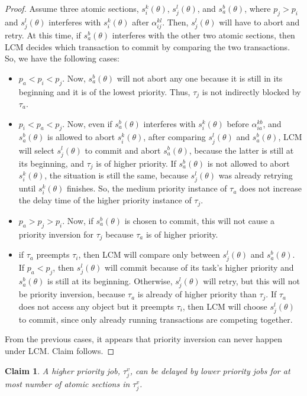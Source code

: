 \documentclass[a4paper,english]{article}
\newtheorem{clm}{Claim}
\newtheorem{proof}{Proof}
\begin{document}
\begin{proof}\normalfont
Assume three atomic sections, $s_i^k(\theta)$, $s_j^l(\theta)$, and $s_a^b(\theta)$, where $p_j > p_i$ and $s_j^l(\theta)$ interferes with $s_i^k(\theta)$ after $\alpha_{ij}^{kl}$. Then, $s_j^l(\theta)$ will have to abort and retry. At this time, if $s_a^b(\theta)$ interferes with the other two atomic sections, then LCM decides which transaction to commit by comparing the two transactions. So, we have the following cases:
\begin{itemize}
\item $p_a < p_i < p_j$. Now, $s_a^b(\theta)$ will not abort any one because it is still in its beginning and it is of the lowest priority. Thus, $\tau_j$ is not indirectly blocked by $\tau_a$.
\item $p_i<p_a<p_j$. Now, even if $s_a^b(\theta)$ interferes with $s_i^k(\theta)$ before $\alpha_{ia}^{kb}$,  and $s_a^b(\theta)$ is allowed to abort $s_i^k(\theta)$, after comparing $s_j^l(\theta)$ and $s_a^b(\theta)$, LCM will select $s_j^l(\theta)$ to commit and abort $s_a^b(\theta)$, because the latter is still at its beginning, and $\tau_j$ is of higher priority. If $s_a^b(\theta)$ is not allowed to abort $s_i^k(\theta)$, the situation is still the same, because $s_j^l(\theta)$ was already retrying until $s_i^k(\theta)$ finishes. So, the medium priority instance of $\tau_a$ does not increase the delay time of the higher priority instance of $\tau_j$.
%
\item $p_a>p_j>p_i$. Now, if $s_a^b(\theta)$ is chosen to commit, this will not cause a priority inversion for $\tau_j$ because $\tau_a$ is of higher priority.
\item if $\tau_a$ preempts $\tau_i$, then LCM will compare only between $s_j^l(\theta)$ and $s_a^b(\theta)$. If $p_a<p_j$, then $s_j^l(\theta)$ will commit because of its task's higher priority and $s_a^b(\theta)$ is still at its beginning. Otherwise, $s_j^l(\theta)$ will retry, but this will not be priority inversion, because $\tau_a$ is already of higher priority than $\tau_j$. If $\tau_a$ does not access any object but it preempts $\tau_i$, then LCM will choose $s_j^l(\theta)$ to commit, since only already running transactions are competing together.
\end{itemize}
%
From the previous cases, it appears that priority inversion can never happen under LCM. Claim follows.
\end{proof}

\begin{clm}
\label{priority_inversion}
A higher priority job, $\tau_j^v$, can be delayed by lower priority jobs for at most number of atomic sections in $\tau_j^v$.
\end{clm}
\end{document}

